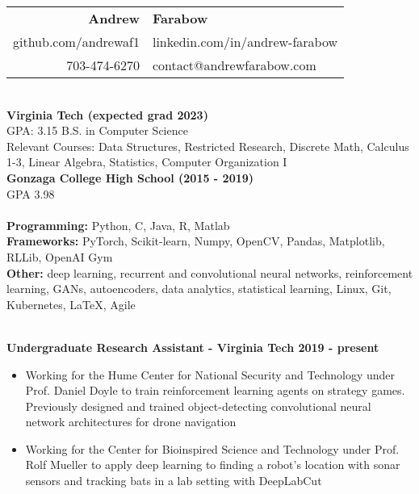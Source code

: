 \documentclass{article}
\begin{document}
  \begin{center}
    \begin{tabular}{r l}
      {\huge\textbf{Andrew}} & {\huge\textbf{Farabow}} \\
      \hspace{35pt} github.com/andrewaf1 & linkedin.com/in/andrew-farabow \\
      703-474-6270 & contact@andrewfarabow.com \\
    \end{tabular}


  \begin{flushleft}
    \begin{multicols}{2}
      {\large\textbf{\underline{}}} \\
      \textbf{Virginia Tech (expected grad 2023)} \\
      GPA: 3.15 \quad B.S. in Computer Science \\
      Relevant Courses: Data Structures, Restricted Research, Discrete Math, Calculus 1-3, Linear Algebra, Statistics, Computer Organization I\\
      \textbf{Gonzaga College High School	(2015 - 2019)} \\
      GPA 3.98 \\
     

    \columnbreak
    {\large\textbf{\underline{}}} \\
    {\textbf{Programming:}} Python, C, Java, R, Matlab \\
    {\textbf{Frameworks:}} PyTorch, Scikit-learn, Numpy, OpenCV, Pandas, Matplotlib, RLLib, OpenAI Gym \\
    {\textbf{Other:}} deep learning, recurrent and convolutional neural networks, reinforcement learning, GANs, autoencoders, data analytics, statistical learning, Linux, Git, Kubernetes, LaTeX, Agile \\

    \end{multicols}

    {\large\textbf{\underline{}}} \\
    \textbf{Undergraduate Research Assistant - Virginia Tech \hfill 2019 - present}
    \begin{itemize}
      \itemsep0em
      \item Working for the Hume Center for National Security and Technology under Prof. Daniel Doyle to train reinforcement learning agents on strategy games. Previously designed and trained object-detecting convolutional neural network architectures for drone navigation
      \item Working for the Center for Bioinspired Science and Technology under Prof. Rolf Mueller to apply deep learning to finding a robot's location with sonar sensors and tracking bats in a lab setting with DeepLabCut
    \end{itemize}



\end{flushleft}
\end{center}
\end{document}
